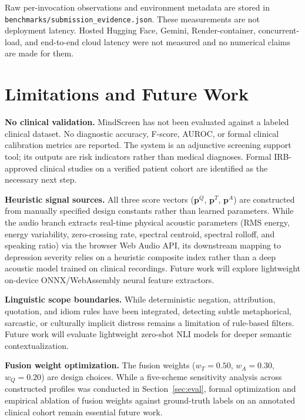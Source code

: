 \documentclass[10pt, conference, letterpaper]{IEEEtran}
\begin{document}
Raw per-invocation observations and environment metadata are stored in
\texttt{benchmarks/submission\_evidence.json}. These measurements are not
deployment latency. Hosted Hugging Face, Gemini, Render-container, concurrent-load,
and end-to-end cloud latency were not measured and no numerical claims are made
for them.
\section{Limitations and Future Work}
\label{sec:limitations}

\textbf{No clinical validation.}
MindScreen has not been evaluated against a labeled clinical dataset.
No diagnostic accuracy, F-score, AUROC, or formal clinical calibration metrics
are reported.
The system is an adjunctive screening support tool; its outputs are risk
indicators rather than medical diagnoses.
Formal IRB-approved clinical studies on a verified patient cohort are identified
as the necessary next step.

\textbf{Heuristic signal sources.}
All three score vectors ($\mathbf{p}^Q$, $\mathbf{p}^T$, $\mathbf{p}^A$) are
constructed from manually specified design constants rather than learned parameters.
While the audio branch extracts real-time physical acoustic parameters
(RMS energy, energy variability, zero-crossing rate, spectral centroid, spectral
rolloff, and speaking ratio) via the browser Web Audio API, its downstream mapping
to depression severity relies on a heuristic composite index rather than a deep
acoustic model trained on clinical recordings.
Future work will explore lightweight on-device ONNX/WebAssembly neural feature
extractors.

\textbf{Linguistic scope boundaries.}
While deterministic negation, attribution, quotation, and idiom rules have been integrated,
detecting subtle metaphorical, sarcastic, or culturally implicit distress
remains a limitation of rule-based filters.
Future work will evaluate lightweight zero-shot NLI models for deeper semantic
contextualization.

\textbf{Fusion weight optimization.}
The fusion weights ($w_T=0.50$, $w_A=0.30$, $w_Q=0.20$) are design choices.
While a five-scheme sensitivity analysis across constructed profiles was
conducted in Section~\ref{sec:eval}, formal optimization and empirical ablation
of fusion weights against ground-truth labels on an annotated clinical cohort
remain essential future work.

\balance
\end{document}
